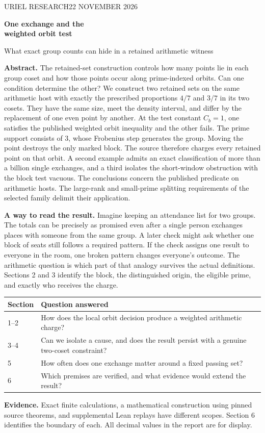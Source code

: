 \documentclass[11pt,letterpaper]{article}
\newcommand{\pp}[1]{\par\medskip\noindent\textbf{#1}\enspace}
\begin{document}
\thispagestyle{plain}
{\sffamily\small\color{teal}URIEL RESEARCH\hfill 22 NOVEMBER 2026}\par\vspace{12pt}
{\Huge\bfseries\color{ink}One exchange and the\\weighted orbit test\par}\vspace{6pt}
{\large\color{muted}What exact group counts can hide in a retained arithmetic witness}\par
\bigskip
\textbf{Abstract.}
The retained-set construction controls how many points lie in each group coset and how those points occur along prime-indexed orbits. Can one condition determine the other? We construct two retained sets on the same arithmetic host with exactly the prescribed proportions \(4/7\) and \(3/7\) in its two cosets. They have the same size, meet the density interval, and differ by the replacement of one even point by another. At the test constant \(C_b=1\), one satisfies the published weighted orbit inequality and the other fails. The prime support consists of 3, whose Frobenius step generates the group. Moving the point destroys the only marked block. The source therefore charges every retained point on that orbit. A second example admits an exact classification of more than a billion single exchanges, and a third isolates the short-window obstruction with the block test vacuous. The conclusions concern the published predicate on arithmetic hosts. The large-rank and small-prime splitting requirements of the selected family delimit their application.

\pp{A way to read the result.} Imagine keeping an attendance list for two groups. The totals can be precisely as promised even after a single person exchanges places with someone from the same group. A later check might ask whether one block of seats still follows a required pattern. If the check assigns one result to everyone in the room, one broken pattern changes everyone's outcome. The arithmetic question is which part of that analogy survives the actual definitions. Sections 2 and 3 identify the block, the distinguished origin, the eligible prime, and exactly who receives the charge.

\smallskip
\begin{tabularx}{\linewidth}{@{}p{.10\linewidth}Y@{}}
\toprule
Section & Question answered\\--2 & How does the local orbit decision produce a weighted arithmetic charge?\\
3--4 & Can we isolate a cause, and does the result persist with a genuine two-coset constraint?\\
5 & How often does one exchange matter around a fixed passing set?\\
6 & Which premises are verified, and what evidence would extend the result?\\\bottomrule
\end{tabularx}
\pp{Evidence.} Exact finite calculations, a mathematical construction using pinned source theorems, and supplemental Lean replays have different scopes. Section 6 identifies the boundary of each. All decimal values in the report are for display.
\end{document}
